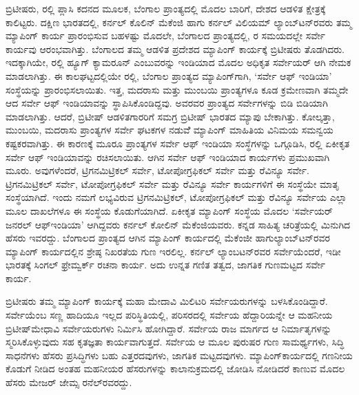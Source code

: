 ಬ್ರಿಟೀಷರು,  ರಲ್ಲಿ ಪ್ಲಾಸಿ ಕದನದ ಮೂಲಕ, ಬೆಂಗಾಲ ಪ್ರಾಂತ್ಯದಲ್ಲಿ ಮೊದಲ ಬಾರಿಗೆ, ದೇಶದ ಆಡಳಿತ ಕ್ಷೇತ್ರಕ್ಕೆ ಕಾಲಿಟ್ಟರು. ದಕ್ಷಿಣ ಭಾರತದಲ್ಲಿ, ಕರ್ನಲ್​ ಕೊಲಿನ್​ ಮೆಕೆಂಜಿ ಹಾಗು ಕರ್ನಲ್​ ವಿಲಿಯಮ್ ಲ್ಯಾಂಬ್​ಟನ್​ರವರು ತಮ್ಮ ಮ್ಯಾಪಿಂಗ್​ ಕಾರ್ಯ ಪ್ರಾರಂಭಿಸುವ ಬಹಳಷ್ಟು ಮೊದಲೇ, ಬೆಂಗಾಲದ ಪ್ರಾಂತ್ಯದಲ್ಲಿ, ರ ಸಮಯದಲ್ಲೇ ಸರ್ವೇ ಕಾರ್ಯವು ಆರಂಭವಾಗಿತ್ತು. ಬೆಂಗಾಲದ ತಮ್ಮ ಆಡಳಿತ ಪ್ರದೇಶದ ಮ್ಯಾಪಿಂಗ್​ ಕಾರ್ಯಕ್ಕೆ ಬ್ರಿಟೀಷರು ತೊಡಗಿದರು. ಇದಕ್ಕಾಗಿಯೇ, ರಲ್ಲಿ ಹ್ಯೂಗ್​ ಕ್ಯಾಮರೂನ್​ ಎಂಬುವರನ್ನು ಇಂಡಿಯಾದ ಮೊದಲ ಅಧಿಕೃತ ಸರ್ವೇಯರ್​ ಆಗಿ ನೇಮಕ ಮಾಡಲಾಗಿತ್ತು. ಈ ಕಾಲಘಟ್ಟದಲ್ಲಿಯೇ ರಲ್ಲಿ, ಬೆಂಗಾಲ ಪ್ರಾಂತ್ಯದ ಮ್ಯಾಪಿಂಗ್​ಗಾಗಿ, ‘ಸರ್ವೇ ಆಫ್​ ಇಂಡಿಯಾ’ ಸಂಸ್ಥೆಯನ್ನು ಪ್ರಾರಂಭಿಸಲಾಯಿತು. ಇತ್ತ, ಮದರಾಸು ಮತ್ತು ಮುಂಬಯಿ ಪ್ರಾಂತ್ಯಗಳೂ ಕೂಡ ಕ್ರಮೇಣವಾಗಿ ತಮ್ಮದೇ ಆದ ಸರ್ವೇ ಆಫ್​ ಇಂಡಿಯಾವನ್ನು ಸ್ಥಾಪಿಸಿಕೊಂಡಿದ್ದವು. ಅವರವರ ಪ್ರಾಂತ್ಯದ ಸರ್ವೇಗಳನ್ನು ಬಿಡಿ ಬಿಡಿಯಾಗಿ ಮಾಡಲಾಗಿತ್ತು. ಆದರೆ, ಬ್ರಿಟೀಷ್​ ಆಡಳಿತಗಾರರಿಗೆ ಸಮಗ್ರ ಬ್ರಿಟೀಷ್​ ಭಾರತದ ಮ್ಯಾಪು ಬೇಕಾಗಿತ್ತು. ಕೋಲ್ಕತ್ತಾ, ಮುಂಬಯಿ, ಮದರಾಸು ಪ್ರಾಂತ್ಯಗಳ ಸರ್ವೇ ಘಟಕಗಳ ನಡುವೆೆ ಮ್ಯಾಪಿಂಗ್​ ಮಾಹಿತಿಯ ವಿನಿಮಯ ಸಮನ್ವಯ ಕಷ್ಟಕರವಾಗಿತ್ತು. ಈ ಕಾರಣಕ್ಕೆ ಮೂರೂ ಪ್ರಾಂತ್ಯಗಳ ಸರ್ವೇ ಆಫ್​ ಇಂಡಿಯಾ ಸಂಸ್ಥೆಗಳನ್ನು ಒಗ್ಗೂಡಿಸಿ, ರಲ್ಲಿ ಏಕೀಕೃತ ಸರ್ವೇ ಆಫ್​ ಇಂಡಿಯಾವನ್ನು ರಚಿಸಲಾಯಿತು. ಆಗಿನ ಸರ್ವೇ ಆಫ್​ ಇಂಡಿಯಾದ ಕಾರ್ಯಗಳು ಪ್ರಮುಖವಾಗಿ ಮೂರು. ಅವುಗಳೆಂದರೆ, ಟ್ರಿಗನಮಿಟ್ರಿಕಲ್​ ಸರ್ವೇ, ಟೋಪೋಗ್ರಫಿಕಲ್​ ಸರ್ವೇ ಮತ್ತು ರೆವಿನ್ಯೂ ಸರ್ವೇ. ಟ್ರಿಗನಮಿಟ್ರಿಕಲ್​ ಸರ್ವೇ, ಟೋಪೋಗ್ರಫಿಕಲ್​ ಸರ್ವೇ ಮತ್ತು ರೆವಿನ್ಯೂ ಸರ್ವೇ ಕಾರ್ಯಗಳಿಗೆ ಈ ಸಂಸ್ಥೆಯೇ ಮಾತೃ ಸಂಸ್ಥೆಯಾಗಿದೆ. ಇಂದು ನಮಗೆ ಲಭ್ಯವಿರುವ ಟ್ರಿಗನಮಿಟ್ರಿಕಲ್​, ಟೋಪೋಗ್ರಫಿಕಲ್​ ಮತ್ತು ರೆವಿನ್ಯೂ ಸರ್ವೇಯ ಎಲ್ಲಾ ಮೂಲ ದಾಖಲೆಗಳೂ ಈ ಸಂಸ್ಥೆಯ ಕೊಡುಗೆಯಾಗಿದೆ. ಏಕೀಕೃತ ಮ್ಯಾಪಿಂಗ್​ ಸಂಸ್ಥೆಯ ಮೊದಲ ‘ಸರ್ವೇಯರ್​ ಜನರಲ್​ ಆಫ್​ ಇಂಡಿಯಾ’ ಆಗಿದ್ದವರು ಕರ್ನಲ್​ ಕೋಲಿನ್​ ಮೆಕೆಂಜಿಯವರು. ಕನ್ನಡ ಸಾಹಿತ್ಯ ಚರಿತ್ರೆಯಲ್ಲಿ ಮಿನುಗಿದ ಹೆಸರು ಇವರದ್ದು. ಬೆಂಗಾಲದ ಪ್ರಾಂತ್ಯದ ಆಗಿನ ಮ್ಯಾಪಿಂಗ್​ ಕಾರ್ಯದಲ್ಲಿ ಮೆಕೆಂಜೀ ಹಾಗು\break ಲ್ಯಾಂಬ್​ಟನ್​ರವರ ಮ್ಯಾಪಿಂಗ್​ ಕಾರ್ಯದಲ್ಲಿನ ಶ್ರೇಷ್ಠ ನಿಖರತೆಯ ಗುಣ ಇರಲಿಲ್ಲ. ಕರ್ನಲ್​ ಲ್ಯಾಂಬಟನ್​ರವರ ಸರ್ವೇಯೆಂದರೆ, ಇಡೀ ಭಾರತಕ್ಕೆ ಸಿಂಗಲ್​ ಫ್ರೇಮ್ವರ್ಕ್ ರಚನಾ ಕಾರ್ಯ. ಅದು ಉನ್ನತ ಗಣಿತ ತತ್ವದ, ಜಾಗತಿಕ ಗುಣಮಟ್ಟದ ಸರ್ವೇ ಕಾರ್ಯ.

\vskip 4pt

ಬ್ರಿಟೀಷರು ತಮ್ಮ ಮ್ಯಾಪಿಂಗ್​ ಕಾರ್ಯಕ್ಕೆ ಮಹಾ ಮೇದಾವಿ ಮಿಲಿಟರಿ ಸರ್ವೇಯರುಗಳನ್ನು ಬಳಸಿಕೊಂಡಿದ್ದಾರೆ. ಸರ್ವೇಯೆಂಬ ಸಣ್ಣ ಹಾದಿಯೂ ಇಲ್ಲದ ಪರಿಸ್ಥಿತಿಯಲ್ಲಿ, ಪರಿಸರದಲ್ಲಿ ಸರ್ವೇಯ ಹೆದ್ದಾರಿಯನ್ನೇ ಆ ಮಹನೀಯ ಬ್ರಿಟೀಷ್​ ಮೇಧಾವಿ ಸರ್ವೇಯರುಗಳು ನಿರ್ಮಿಸಿ ಹೋಗಿದ್ದಾರೆ. ಸರ್ವೇಯ ರಾಜ ಮಾರ್ಗದ ಆ ನಿರ್ಮಾತೃಗಳನ್ನು ಸ್ಮರಿಸಿಕೊಳ್ಳುವುದು ಸಹ ಕೃತಜ್ಞತಾ ಕಾರ್ಯವಾಗುತ್ತದೆ. ಸರ್ವೇಯ ಆ ಮೂಲ ಪುರುಷರ ಗುಣ ಸಾಮರ್ಥ್ಯಗಳು, ಸಿದ್ಧಿ ಸಾಧನೆಗಳು ಹೆಸರು ಪ್ರಸಿದ್ಧಿಗಳು ಬಹು ಎತ್ತರದವುಗಳು, ಜಾಗತಿಕ ಮಟ್ಟದವುಗಳು. ಮ್ಯಾಪಿಂಗ್​ ಕಾರ್ಯದಲ್ಲಿ ಗಣನೀಯ ಕೊಡುಗೆ ನೀಡಿದ ಅಂತಹ ಮಹನೀಯರ ಹೆಸರುಗಳನ್ನು ಕಾಲಾನುಕ್ರಮದಲ್ಲಿ ಜೋಡಿಸಿ ನೋಡಿದರೆ ಕಾಣುವ ಮೊದಲ ಹೆಸರು ಮೇಜರ್​ ಜೇಮ್ಸ ರನೆಲ್​ರವರದ್ದು.

\vskip 4pt


